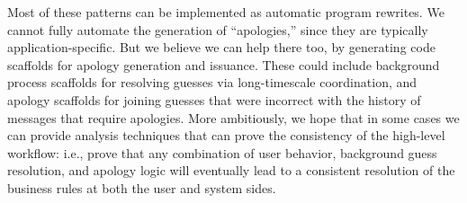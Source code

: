 Most of these patterns can be implemented as automatic program rewrites.  We cannot fully automate the generation of ``apologies,'' since they are typically application-specific.  But we believe we can help there too, by generating code scaffolds for apology generation and issuance.  These could include background process scaffolds for resolving guesses via long-timescale coordination, and apology scaffolds for joining guesses that were incorrect with the history of messages that require apologies.  More ambitiously, we hope that in some cases we can provide analysis techniques that can prove the consistency of the high-level workflow: i.e., prove that any combination of user behavior, background guess resolution, and apology logic will eventually lead to a consistent resolution of the business rules at both the user and system sides.